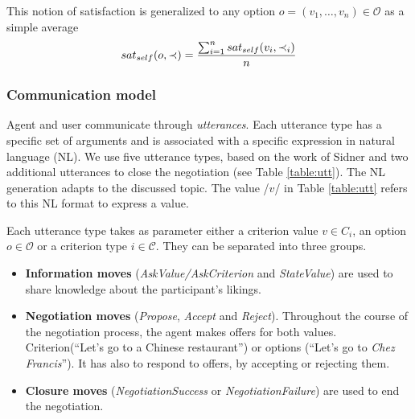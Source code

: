 \documentclass[runningheads,a4paper]{llncs}
\begin{document}
	This notion of satisfaction is generalized to any option $o= (v_1, \ldots, v_n)\in \mathcal{O}$ as a simple average
	\vspace{-1em} 
	\begin{equation}
	sat_{self}(o, \prec) = \frac{\sum_{i=1}^{n} sat_{self}(v_i, \prec_i) }{n}
	\vspace{-1.5em} 
	\end{equation}
	
	
	\subsubsection{Communication model}
	\label{Comm}
	Agent and user communicate through \emph{utterances}. Each utterance type has a specific set of arguments and is associated with a specific expression in natural language (NL). We use five utterance types, based on the work of Sidner \cite{sidner1994artificial} and two additional utterances to close the negotiation (see Table \ref{table:utt}). The NL generation adapts to the discussed topic. The value /$v$/ in Table \ref{table:utt} refers to this NL format to express a value.
	
	
	Each utterance type takes as parameter either a criterion value $v \in C_i$, an option $o \in \mathcal{O}$ or a criterion type $i \in \mathcal{C}$. They can be separated into three groups. 
	
	\begin{itemize}
		\item \textbf{Information moves }(\textit{AskValue/AskCriterion} and \textit{StateValue}) are used to share knowledge about the participant's likings.
		\item \textbf{Negotiation moves} (\textit{Propose}, \textit{Accept} and \textit{Reject}). Throughout the course of the negotiation process, the agent makes offers for both values. Criterion(``Let's go to a Chinese restaurant'') or options (``Let's go to \emph{Chez Francis}''). It has also to respond to offers, by accepting or rejecting them.
		
		\item \textbf{Closure moves} (\textit{NegotiationSuccess} or \textit{NegotiationFailure}) are used to end the negotiation.
	\end{itemize}
	
	
	
\end{document}
